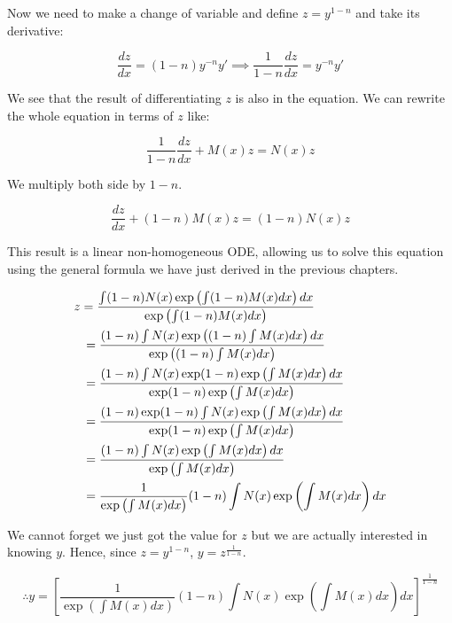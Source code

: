 \documentclass[12pt]{article}
\begin{document}
	Now we need to make a change of variable and define $z = y^{1 - n}$ and take its derivative:
	
	\[
		\frac{dz}{dx} = (1 - n) y^{-n} y'
		\implies \frac{1}{1 - n} \frac{dz}{dx} = y^{-n} y'
	\]
	
	We see that the result of differentiating $z$ is also in the equation. We can rewrite the whole equation in terms of $z$ like:
	
	\[
		\frac{1}{1 - n} \frac{dz}{dx} + M(x) z = N(x) z
	\]
	
	We multiply both side by $1 - n$.
	
	\[
		\frac{dz}{dx} + (1 - n) M(x) z = (1 - n) N(x) z
	\]
	
	This result is a linear non-homogeneous ODE, allowing us to solve this equation using the general formula we have just derived in the previous chapters.
	
	\[
		\begin{aligned}
			& z = \frac{\int (1 - n) N(x) \exp\left(\int (1 - n)M(x) dx \right) dx}{\exp\left(\int (1 - n)M(x) dx\right)}
			\\
			& \hspace{0.7em} = \frac{(1 - n) \int N(x) \exp\left((1 - n) \int M(x) dx \right) dx}{\exp\left((1 - n) \int M(x) dx\right)}
			\\
			& \hspace{0.7em} = \frac{(1 - n) \int N(x) \exp(1 - n)  \exp\left(\int M(x) dx \right) dx}{\exp(1 - n)  \exp\left(\int M(x) dx \right)}
			\\
			& \hspace{0.7em} = \frac{(1 - n) \exp(1 - n) \int N(x) \exp\left(\int M(x) dx \right) dx}{\exp(1 - n)  \exp\left(\int M(x) dx \right)}
			\\
			& \hspace{0.7em} = \frac{(1 - n) \int N(x) \exp\left(\int M(x) dx \right) dx}{\exp\left(\int M(x) dx \right)}
			\\
			& \hspace{0.7em} = \frac{1}{\exp\left(\int M(x) dx \right)} (1 - n) \int N(x) \exp\left(\int M(x) dx \right) dx
		\end{aligned}
	\]
	
	We cannot forget we just got the value for $z$ but we are actually interested in knowing $y$. Hence, since $z = y^{1 - n}$, $y = z^{\frac{1}{1 - n}}$.
	
	\[
		\therefore y = \left[ \frac{1}{\exp\left(\int M(x) dx \right)} (1 - n) \int N(x) \exp\left(\int M(x) dx \right) dx \right] ^ {\frac{1}{1 - n}}
	\]
	
\end{document}
